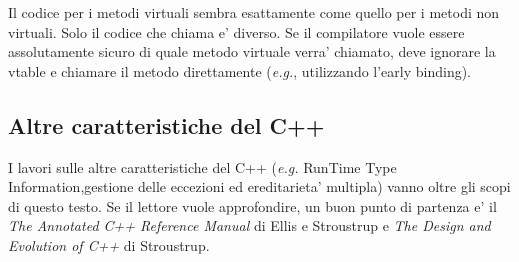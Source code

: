 Il codice per i metodi virtuali sembra esattamente come quello per i metodi
non virtuali. Solo il codice che chiama e' diverso. Se il compilatore vuole
essere assolutamente sicuro di quale metodo virtuale verra' chiamato, deve
ignorare la vtable e chiamare il metodo direttamente (\emph{e.g.}, utilizzando
l'early binding).

\subsection{Altre caratteristiche del C++}

I lavori sulle altre caratteristiche del C++ (\emph{e.g.} RunTime Type
Information,gestione delle eccezioni ed ereditarieta' multipla) vanno
oltre gli scopi di questo testo. Se il lettore vuole approfondire,
un buon punto di partenza e' il \emph{The Annotated C++ Reference Manual}
di Ellis e Stroustrup e \emph{The Design and Evolution of C++} di
Stroustrup.


